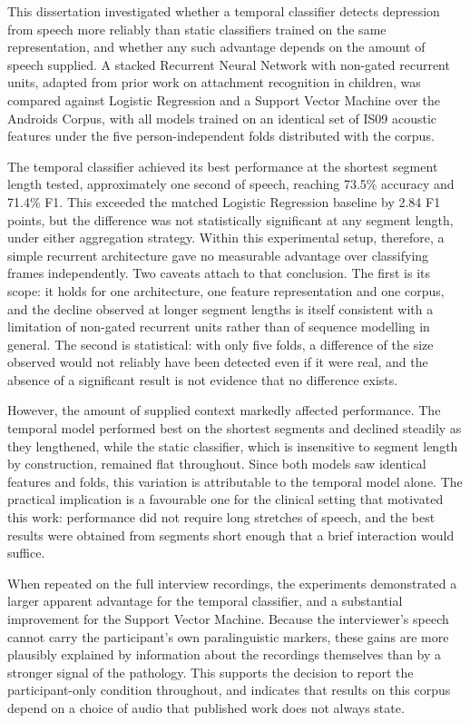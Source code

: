 \documentclass{mproj}
\begin{document}
This dissertation investigated whether a temporal classifier detects depression from speech more reliably than static classifiers trained on the same representation, and whether any such advantage depends on the amount of speech supplied. A stacked Recurrent Neural Network with non-gated recurrent units, adapted from prior work on attachment recognition in children, was compared against Logistic Regression and a Support Vector Machine over the Androids Corpus, with all models trained on an identical set of IS09 acoustic features under the five person-independent folds distributed with the corpus.

The temporal classifier achieved its best performance at the shortest segment length tested, approximately one second of speech, reaching 73.5\% accuracy and 71.4\% F1. This exceeded the matched Logistic Regression baseline by 2.84 F1 points, but the difference was not statistically significant at any segment length, under either aggregation strategy. Within this experimental setup, therefore, a simple recurrent architecture gave no measurable advantage over classifying frames independently. Two caveats attach to that conclusion. The first is its scope: it holds for one architecture, one feature representation and one corpus, and the decline observed at longer segment lengths is itself consistent with a limitation of non-gated recurrent units rather than of sequence modelling in general. The second is statistical: with only five folds, a difference of the size observed would not reliably have been detected even if it were real, and the absence of a significant result is not evidence that no difference exists.

However, the amount of supplied context markedly affected performance. The temporal model performed best on the shortest segments and declined steadily as they lengthened, while the static classifier, which is insensitive to segment length by construction, remained flat throughout. Since both models saw identical features and folds, this variation is attributable to the temporal model alone. The practical implication is a favourable one for the clinical setting that motivated this work: performance did not require long stretches of speech, and the best results were obtained from segments short enough that a brief interaction would suffice.

When repeated on the full interview recordings, the experiments demonstrated a larger apparent advantage for the temporal classifier, and a substantial improvement for the Support Vector Machine. Because the interviewer's speech cannot carry the participant's own paralinguistic markers, these gains are more plausibly explained by information about the recordings themselves than by a stronger signal of the pathology. This supports the decision to report the participant-only condition throughout, and indicates that results on this corpus depend on a choice of audio that published work does not always state.
\end{document}
